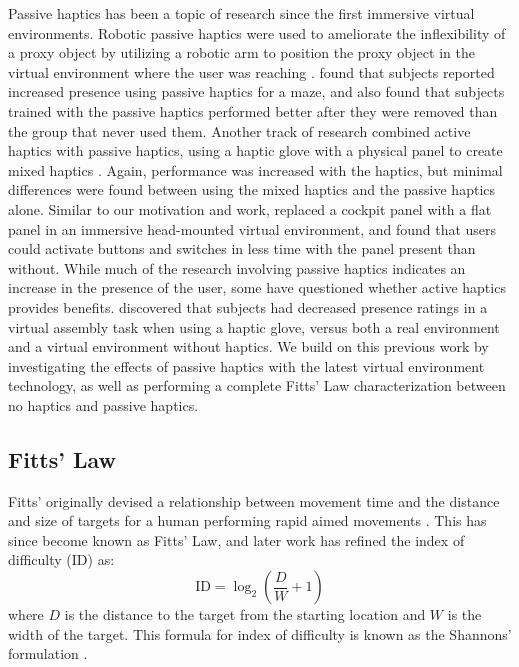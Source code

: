 Passive haptics has been a topic of research since the first immersive virtual environments.
Robotic passive haptics were used to ameliorate the inflexibility of a proxy object by utilizing a robotic arm to position the proxy object in the virtual environment where the user was reaching \citep{tachi_construction_1994,mcneely_robotic_1993}.
\citet{insko_passive_2001} found that subjects reported increased presence using passive haptics for a maze, and also found that subjects trained with the passive haptics performed better after they were removed than the group that never used them.
Another track of research combined active haptics with passive haptics, using a haptic glove with a physical panel to create mixed haptics \citep{borst_evaluation_2005}.
Again, performance was increased with the haptics, but minimal differences were found between using the mixed haptics and the passive haptics alone.
Similar to our motivation and work, \citet{schiefele_simple_1998} replaced a cockpit panel with a flat panel in an immersive head-mounted virtual environment, and found that users could activate buttons and switches in less time with the panel present than without.
While much of the research involving passive haptics indicates an increase in the presence of the user, some have questioned whether active haptics provides benefits.
\citet{pontonnier_designing_2014} discovered that subjects had decreased presence ratings in a virtual assembly task when using a haptic glove, versus both a real environment and a virtual environment without haptics.
We build on this previous work by investigating the effects of passive haptics with the latest virtual environment technology, as well as performing a complete Fitts' Law characterization between no haptics and passive haptics.

\subsection{Fitts' Law}

Fitts' originally devised a relationship between movement time and the distance and size of targets for a human performing rapid aimed movements \citep{fitts_information_1954}.
This has since become known as Fitts' Law, and later work has refined the index of difficulty ($\mathrm{ID}$) as:
\begin{equation}
    \mathrm{ID}=\log_2\left(\frac{D}{W}+1\right)
    \label{eq:index_of_difficulty}
\end{equation}
where $D$ is the distance to the target from the starting location and $W$ is the width of the target.
This formula for index of difficulty is known as the Shannons' formulation \citep{mackenzie_note_1989}.

